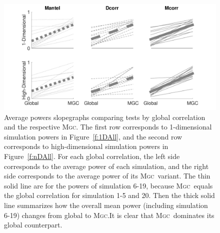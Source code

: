 \documentclass[11pt]{article}
\newcommand{\note}[2][]{\added[#1,remark={#2}]{}}
\providecommand{\sct}[1]{{\normalfont\textsc{#1}}}
\newcommand{\Mgc}{\sct{Mgc}}
\newcommand{\Dcorr}{\sct{Dcorr}}
\newcommand{\Mantel}{\sct{Mantel}}
\newcommand{\jv}[1]{{\note{jv: #1}}}
\newcommand{\cs}[1]{{\note{cs: #1}}}
\begin{document}


\begin{figure}
  \centering
  \includegraphics[width=1.0\textwidth]{../Figures/FigSlope}
  \caption{
Average powers slopegraphs comparing tests by global correlation and the respective \Mgc. The first row corresponds to 1-dimensional simulation powers in Figure~\ref{f:1DAll}, and the second row corresponds to high-dimensional simulation powers in Figure~\ref{f:nDAll}. For each global correlation,  the left side corresponds to the average power of each simulation, and the right side corresponds to the average power of its \Mgc~variant. The thin solid line are for the powers of simulation 6-19, because \Mgc~equals the global correlation for simulation 1-5 and  20. Then the thick solid line summarizes how the overall mean power (including simulation 6-19) changes from global to \Mgc.It is clear that \Mgc~dominates its global counterpart. 
\cs{this caption is not right}
\jv{fixed?}
}
\label{f:pp}
\end{figure}
\end{document}
